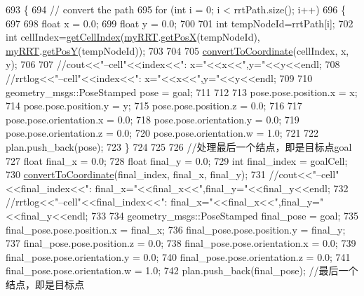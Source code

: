 \begin{DoxyCode}
693 \{
694     \textcolor{comment}{// convert the path}
695     \textcolor{keywordflow}{for} (\textcolor{keywordtype}{int} i = 0; i < rrtPath.size(); i++)
696     \{
697 
698         \textcolor{keywordtype}{float} x = 0.0;
699         \textcolor{keywordtype}{float} y = 0.0;
700 
701         \textcolor{keywordtype}{int} tempNodeId=rrtPath[i];
702         \textcolor{keywordtype}{int} cellIndex=\hyperlink{classrrt__plan_1_1rrt__planner_a7df38e380fe80d69be29d1cea2879c59}{getCellIndex}(\hyperlink{rrt__planner_8cpp_a51725e16375c08b52f82eb2faa5a921c}{myRRT}.\hyperlink{classRRT_a54760030f6b61b258b6eec4472ced906}{getPosX}(tempNodeId),
      \hyperlink{rrt__planner_8cpp_a51725e16375c08b52f82eb2faa5a921c}{myRRT}.\hyperlink{classRRT_a499a6d42d47b76c306a80573cba0a555}{getPosY}(tempNodeId));
703 
704 
705         \hyperlink{classrrt__plan_1_1rrt__planner_ad21e1c308a79678ca6265907bf6caa84}{convertToCoordinate}(cellIndex, x, y);
706 
707         \textcolor{comment}{//cout<<"--cell"<<index<<": x="<<x<<",y="<<y<<endl;}
708         \textcolor{comment}{//rrtlog<<"--cell"<<index<<": x="<<x<<",y="<<y<<endl;}
709 
710         geometry\_msgs::PoseStamped pose = goal;
711 
712 
713         pose.pose.position.x = x;
714         pose.pose.position.y = y;
715         pose.pose.position.z = 0.0;
716 
717         pose.pose.orientation.x = 0.0;
718         pose.pose.orientation.y = 0.0;
719         pose.pose.orientation.z = 0.0;
720         pose.pose.orientation.w = 1.0;
721 
722         plan.push\_back(pose);
723     \}
724 
725 
726     \textcolor{comment}{//处理最后一个结点，即是目标点goal}
727     \textcolor{keywordtype}{float} final\_x = 0.0;
728     \textcolor{keywordtype}{float} final\_y = 0.0;
729     \textcolor{keywordtype}{int} final\_index = goalCell;
730     \hyperlink{classrrt__plan_1_1rrt__planner_ad21e1c308a79678ca6265907bf6caa84}{convertToCoordinate}(final\_index, final\_x, final\_y);
731     \textcolor{comment}{//cout<<"--cell"<<final\_index<<": final\_x="<<final\_x<<",final\_y="<<final\_y<<endl;}
732     \textcolor{comment}{//rrtlog<<"--cell"<<final\_index<<": final\_x="<<final\_x<<",final\_y="<<final\_y<<endl;}
733 
734     geometry\_msgs::PoseStamped final\_pose = goal;
735     final\_pose.pose.position.x = final\_x;
736     final\_pose.pose.position.y = final\_y;
737     final\_pose.pose.position.z = 0.0;
738     final\_pose.pose.orientation.x = 0.0;
739     final\_pose.pose.orientation.y = 0.0;
740     final\_pose.pose.orientation.z = 0.0;
741     final\_pose.pose.orientation.w = 1.0;
742     plan.push\_back(final\_pose);  \textcolor{comment}{//最后一个结点，即是目标点}

\end{DoxyCode}
